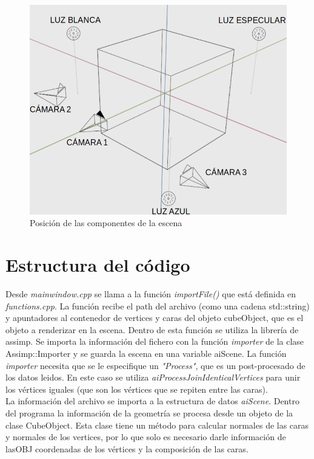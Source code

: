 \documentclass[12pt]{article}
\begin{document}
\begin{figure}[H]
\centering
\includegraphics[scale=0.3]{images/ESCENAA.png}
\caption{Posición de las componentes de la escena}
\end{figure}



\section{Estructura del código}

Desde \textit{mainwindow.cpp} se llama a la función \textit{importFile()} que está definida en \textit{functions.cpp}. La función recibe el path del archivo (como una cadena std::string) y apuntadores al contenedor de vertices y caras del objeto cubeObject, que es el objeto  a renderizar en la escena. Dentro de esta función se utiliza la librería de assimp. Se importa la información del fichero con la función \textit{importer} de la clase Assimp::Importer  y se guarda la escena en una variable aiScene. La función \textit{importer} necesita que se le especifique un \textit{"Process"}, que es un post-procesado de los datos leidos. En este caso se utiliza \textit{aiProcessJoinIdenticalVertices} para unir los vértices iguales (que son los vértices que se repiten entre las caras). 
\\

La información del archivo se importa a la estructura de datos \textit{aiScene}. Dentro del programa la información de la geometría se procesa desde un objeto de la clase CubeObject. Esta clase tiene un método para calcular normales de las caras y normales de los vertices, por lo que solo es necesario darle información de lasOBJ coordenadas de los vértices y la composición de las caras.
\\
\end{document}
